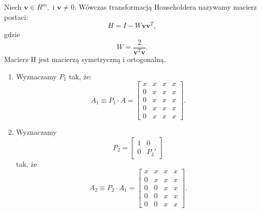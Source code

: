 \documentclass[notheorems]{beamer}
\newcommand{\vr}[1]{\mathbf{#1}}
\newcommand{\mx}[1]{{#1}}
\begin{document}
\begin{frame}
\begin{theorem} 
Niech  $\vr{v}\in R^{m}, $ i $\vr{v}\neq 0. $ Wówczas transformacją Householdera nazywamy macierz postaci:
$$
\mx{H}=\mx{I}-W\vr{v}\vr{v}^{T},
$$
gdzie
$$
W={\frac {2}{\vr{v}^{T}\vr{v}}}.
$$ 
Macierz H jest macierzą symetryczną i ortogonalną.
\end{theorem}
\end{frame}

\begin{frame}
\begin{example}
\begin{enumerate}
\item Wyznaczamy $P_{1}$ tak, że:
$$
\mx{A_{1} \equiv {P_{1}\cdot A}}= \begin{bmatrix}
x & x & x & x \\
0 & x & x & x  \\
0 & x & x & x \\
0 & x & x & x  \\
0 & x & x & x 
\end{bmatrix}.
$$
\item Wyznaczamy 
$$
P_{2} = \left[ 
\begin{array}{c|c}
1 & 0 \\\hline
0 & P_2'
\end{array}
\right]
$$ 
tak, że
$$
\mx{A_{2} \equiv {P_{2}\cdot A_{1}}}= \begin{bmatrix}
x & x & x & x \\
0 & x & x & x  \\
0 & 0 & x & x \\
0 & 0 & x & x  \\
0 & 0 & x & x 
\end{bmatrix}.
$$
\end{enumerate}
\end{example}
\end{frame}
\end{document}
